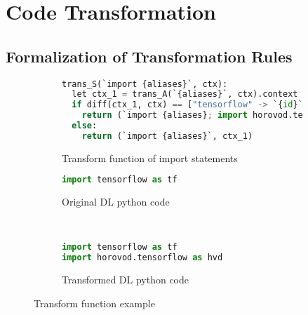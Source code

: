 \section{Code Transformation}\label{sec:trans}

\subsection{Formalization of Transformation Rules}

\begin{figure}[ht!]
	\begin{subfigure}{1\textwidth}
		\centering
		\begin{lstlisting}[language=Python]
trans_S(`import {aliases}`, ctx):
  let ctx_1 = trans_A(`{aliases}`, ctx).context
  if diff(ctx_1, ctx) == ["tensorflow" -> `{id}`]:
    return (`import {aliases}; import horovod.tensorflow as hvd`, ctx_1)
  else:
    return (`import {aliases}`, ctx_1)
		\end{lstlisting}
		\caption{Transform function of import statements}
		\label{fig:trans:ex01:code}
	\end{subfigure}

    \begin{subfigure}[b]{0.4\textwidth}
        \begin{lstlisting}[language=Python]
import tensorflow as tf\end{lstlisting}
        \caption{Original DL python code}
        \label{fig:trans:ex01:org}
    \end{subfigure}
    ~
    \begin{subfigure}[b]{0.56\textwidth}
        \begin{lstlisting}[language=Python]
import tensorflow as tf
import horovod.tensorflow as hvd\end{lstlisting}
        \caption{Transformed DL python code}
        \label{fig:trans:ex01:hvd}
    \end{subfigure}

	\caption{Transform function example}
    \label{fig:trans:fnexpl}
\end{figure}


